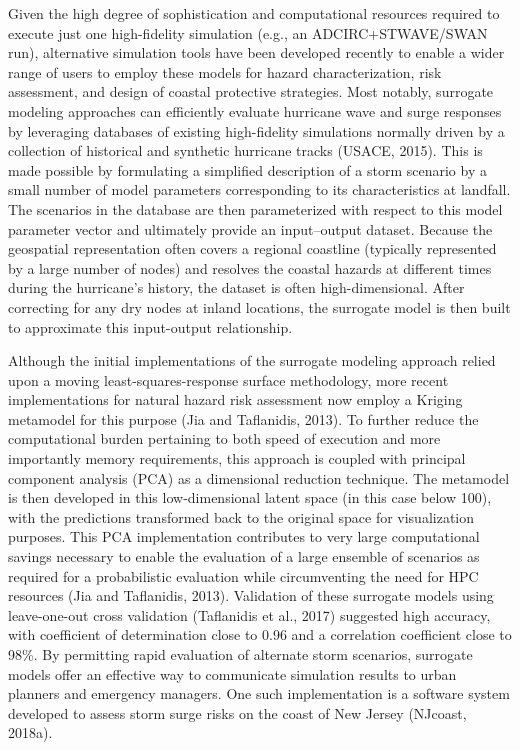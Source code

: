 Given the high degree of sophistication and computational resources required to execute just one high-fidelity simulation (e.g., an ADCIRC+STWAVE/SWAN run), alternative simulation tools have been developed recently to enable a wider range of users to employ these models for hazard characterization, risk assessment, and design of coastal protective strategies. Most notably, surrogate modeling approaches can efficiently evaluate hurricane wave and surge responses by leveraging databases of existing high-fidelity simulations normally driven by a collection of historical and synthetic hurricane tracks (USACE, 2015). This is made possible by formulating a simplified description of a storm scenario by a small number of model parameters corresponding to its characteristics at landfall. The scenarios in the database are then parameterized with respect to this model parameter vector and ultimately provide an input–output dataset. Because the geospatial representation often covers a regional coastline (typically represented by a large number of nodes) and resolves the coastal hazards at different times during the hurricane’s history, the dataset is often high-dimensional. After correcting for any dry nodes at inland locations, the surrogate model is then built to approximate this input-output relationship. 

Although the initial implementations of the surrogate modeling approach relied upon a moving least-squares-response surface methodology, more recent implementations for natural hazard risk assessment now employ a Kriging metamodel for this purpose (Jia and Taflanidis, 2013). To further reduce the computational burden pertaining to both speed of execution and more importantly memory requirements, this approach is coupled with principal component analysis (PCA) as a dimensional reduction technique. The metamodel is then developed in this low-dimensional latent space (in this case below 100), with the predictions transformed back to the original space for visualization purposes. This PCA implementation contributes to very large computational savings necessary to enable the evaluation of a large ensemble of scenarios as required for a probabilistic evaluation while circumventing the need for HPC resources (Jia and Taflanidis, 2013). Validation of these surrogate models using leave-one-out cross validation (Taflanidis et al., 2017) suggested high accuracy, with coefficient of determination close to 0.96 and a correlation coefficient close to 98\%. By permitting rapid evaluation of alternate storm scenarios, surrogate models offer an effective way to communicate simulation results to urban planners and emergency managers. One such implementation is a software system developed to assess storm surge risks on the coast of New Jersey (NJcoast, 2018a).

